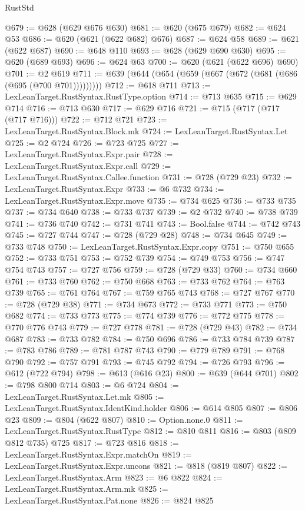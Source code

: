 \begin{lexlean}{RustStd}
\begin{coremodule}
@679 := @628 (@629 @676 @630)
@681 := @620 (@675 @679)
@682 := @624 @53
@686 := @620 (@621 (@622 @682) @676)
@687 := @624 @58
@689 := @621 (@622 @687)
@690 := @648 @110
@693 := @628 (@629 @690 @630)
@695 := @620 (@689 @693)
@696 := @624 @63
@700 := @620 (@621 (@622 @696) @690)
@701 := @2 @619
@711 := @639 (@644 (@654 (@659 (@667 (@672 (@681 (@686 (@695 (@700 @701)))))))))
@712 := @618 @711
@713 := LexLeanTarget.RustSyntax.RustType.option
@714 := @713 @635
@715 := @629 @714
@716 := @713 @630
@717 := @629 @716
@721 := @715 (@717 (@717 (@717 @716)))
@722 := @712 @721
@723 := LexLeanTarget.RustSyntax.Block.mk
@724 := LexLeanTarget.RustSyntax.Let
@725 := @2 @724
@726 := @723 @725
@727 := LexLeanTarget.RustSyntax.Expr.pair
@728 := LexLeanTarget.RustSyntax.Expr.call
@729 := LexLeanTarget.RustSyntax.Callee.function
@731 := @728 (@729 @23)
@732 := LexLeanTarget.RustSyntax.Expr
@733 := @6 @732
@734 := LexLeanTarget.RustSyntax.Expr.move
@735 := @734 @625
@736 := @733 @735
@737 := @734 @640
@738 := @733 @737
@739 := @2 @732
@740 := @738 @739
@741 := @736 @740
@742 := @731 @741
@743 := Bool.false
@744 := @742 @743
@745 := @727 @744
@747 := @728 (@729 @28)
@748 := @734 @645
@749 := @733 @748
@750 := LexLeanTarget.RustSyntax.Expr.copy
@751 := @750 @655
@752 := @733 @751
@753 := @752 @739
@754 := @749 @753
@756 := @747 @754 @743
@757 := @727 @756
@759 := @728 (@729 @33)
@760 := @734 @660
@761 := @733 @760
@762 := @750 @668
@763 := @733 @762
@764 := @763 @739
@765 := @761 @764
@767 := @759 @765 @743
@768 := @727 @767
@770 := @728 (@729 @38)
@771 := @734 @673
@772 := @733 @771
@773 := @750 @682
@774 := @733 @773
@775 := @774 @739
@776 := @772 @775
@778 := @770 @776 @743
@779 := @727 @778
@781 := @728 (@729 @43)
@782 := @734 @687
@783 := @733 @782
@784 := @750 @696
@786 := @733 @784 @739
@787 := @783 @786
@789 := @781 @787 @743
@790 := @779 @789
@791 := @768 @790
@792 := @757 @791
@793 := @745 @792
@794 := @726 @793
@796 := @612 (@722 @794)
@798 := @613 (@616 @23)
@800 := @639 (@644 @701)
@802 := @798 @800 @714
@803 := @6 @724
@804 := LexLeanTarget.RustSyntax.Let.mk
@805 := LexLeanTarget.RustSyntax.IdentKind.holder
@806 := @614 @805
@807 := @806 @23
@809 := @804 (@622 @807)
@810 := Option.none.{0}
@811 := LexLeanTarget.RustSyntax.RustType
@812 := @810 @811
@816 := @803 (@809 @812 @735) @725
@817 := @723 @816
@818 := LexLeanTarget.RustSyntax.Expr.matchOn
@819 := LexLeanTarget.RustSyntax.Expr.uncons
@821 := @818 (@819 @807)
@822 := LexLeanTarget.RustSyntax.Arm
@823 := @6 @822
@824 := LexLeanTarget.RustSyntax.Arm.mk
@825 := LexLeanTarget.RustSyntax.Pat.none
@826 := @824 @825

\end{coremodule}
\end{lexlean}
